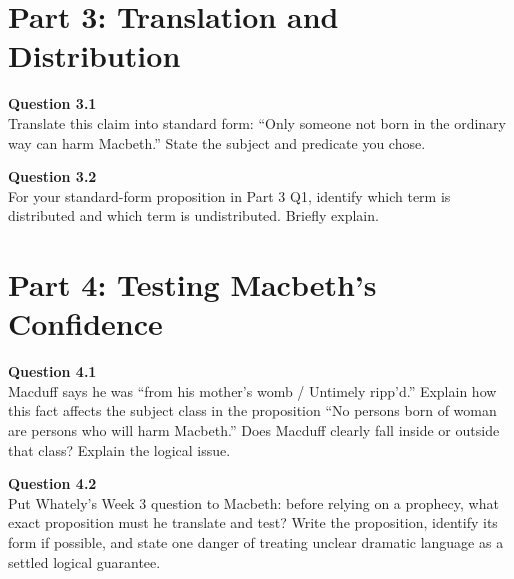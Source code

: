 \documentclass[12pt]{article}
\begin{document}

\newpage

\section*{Part 3: Translation and Distribution}

\textbf{Question 3.1}\\[-0.15em]
Translate this claim into standard form: ``Only someone not born in the ordinary way can harm Macbeth.'' State the subject and predicate you chose.


\textbf{Question 3.2}\\[-0.15em]
For your standard-form proposition in Part 3 Q1, identify which term is distributed and which term is undistributed. Briefly explain.


\newpage

\section*{Part 4: Testing Macbeth's Confidence}

\textbf{Question 4.1}\\[-0.15em]
Macduff says he was ``from his mother's womb / Untimely ripp'd.'' Explain how this fact affects the subject class in the proposition ``No persons born of woman are persons who will harm Macbeth.'' Does Macduff clearly fall inside or outside that class? Explain the logical issue.


\textbf{Question 4.2}\\[-0.15em]
Put Whately's Week 3 question to Macbeth: before relying on a prophecy, what exact proposition must he translate and test? Write the proposition, identify its form if possible, and state one danger of treating unclear dramatic language as a settled logical guarantee.

\end{document}
